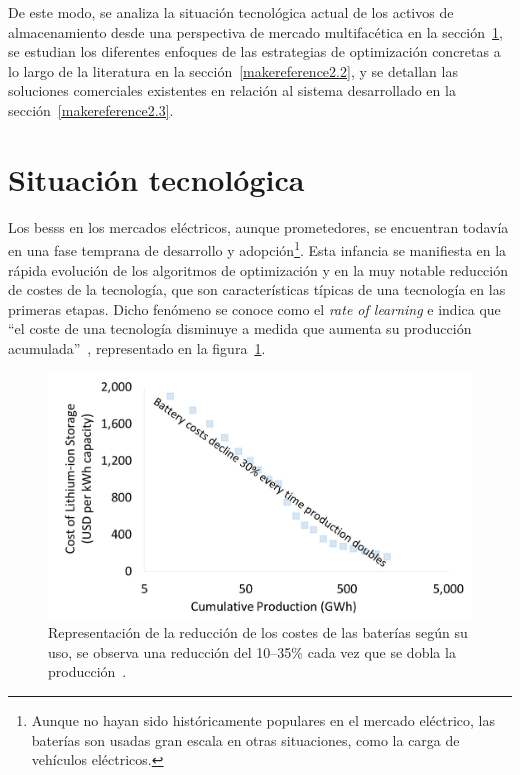 De este modo, se analiza la situación tecnológica actual de los activos de almacenamiento desde una perspectiva de mercado multifacética en la sección~\ref{makereference2.1}, se estudian los diferentes enfoques de las estrategias de optimización concretas a lo largo de la literatura en la sección~\ref{makereference2.2}, y se detallan las soluciones comerciales existentes en relación al sistema desarrollado en la sección~\ref{makereference2.3}.

\section{Situación tecnológica}
\label{makereference2.1}

Los \glspl{bess} en los mercados eléctricos, aunque prometedores, se encuentran todavía en una fase temprana de desarrollo y adopción\footnote{Aunque no hayan sido históricamente populares en el mercado eléctrico, las baterías son usadas  gran escala en otras situaciones, como la carga de vehículos eléctricos.}. Esta infancia se manifiesta en la rápida evolución de los algoritmos de optimización y en la muy notable reducción de costes de la tecnología, que son características típicas de una tecnología en las primeras etapas. Dicho fenómeno se conoce como el \textit{rate of learning} e indica que ``el coste de una tecnología disminuye a medida que aumenta su producción acumulada''~\cite{mathew2021climate, louwen2018technological}, representado en la figura~\ref{fig:rate-of-learning}.

\begin{figure}
  \centering
  \includegraphics[width=0.75\linewidth]{figures/rate-of-learning.jpg}
  \caption[Reducción de los costes de las baterías por su uso.]{Representación de la reducción de los costes de las baterías según su uso, se observa una reducción del 10--35\% cada vez que se dobla la producción~\cite{irena2025irena}.}
  \label{fig:rate-of-learning}
\end{figure}

